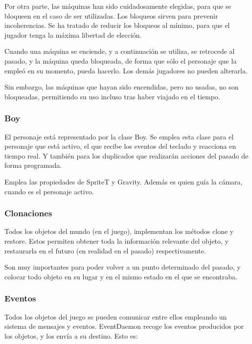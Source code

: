 \documentclass[11pt,a4paper]{article}
\begin{document}
Por otra parte, las máquinas han sido cuidadosamente elegidas, para que se 
bloqueen en el caso de ser utilizadas. Los bloqueos sirven para prevenir 
incoherencias. Se ha tratado de reducir los bloqueos al mínimo, para que el 
jugador tenga la máxima libertad de elección.

Cuando una máquina se enciende, y a continuación se utiliza, se retrocede al 
pasado, y la máquina queda bloqueada, de forma que sólo el personaje que la 
empleó en su momento, pueda hacerlo. Los demás jugadores no pueden alterarla.

Sin embargo, las máquinas que hayan sido encendidas, pero no usadas, no son 
bloqueadas, permitiendo su uso incluso tras haber viajado en el tiempo.

\subsubsection{Boy}

El personaje está representado por la clase Boy. Se emplea esta clase para el 
personaje que está activo, el que recibe los eventos del teclado y reacciona en 
tiempo real. Y también para los duplicados que realizarán acciones del pasado de 
forma programada.

Emplea las propiedades de SpriteT y Gravity. Además es quien guía la cámara, 
cuando es el personaje activo.

\subsubsection{Clonaciones}

Todos los objetos del mundo (en el juego), implementan los métodos clone y 
restore. Estos permiten obtener toda la información relevante del objeto, y 
restaurarla en el futuro (en realidad en el pasado) respectivamente.

Son muy importantes para poder volver a un punto determinado del pasado, y 
colocar todo objeto en su lugar y en el mismo estado en el que se encontraba.

\subsubsection{Eventos}

Todos los objetos del juego se pueden comunicar entre ellos empleando un sistema 
de mensajes y eventos. EventDaemon recoge los eventos producidos por los 
objetos, y los envía a su destino. Esto es:
\end{document}

